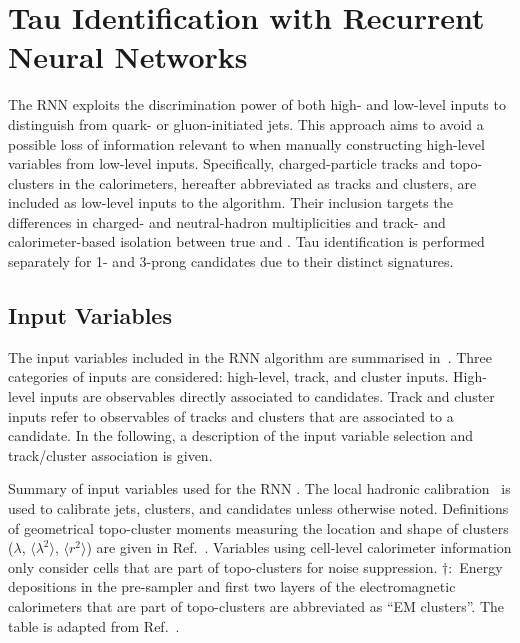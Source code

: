 \section{Tau Identification with Recurrent Neural Networks}%
\label{sec:tauid_rnn}

The RNN \tauid exploits the discrimination power of both high- and low-level
inputs to distinguish \tauhad from quark- or gluon-initiated jets. This approach
aims to avoid a possible loss of information relevant to \tauid when manually
constructing high-level variables from low-level inputs. Specifically,
charged-particle tracks and topo-clusters in the calorimeters, hereafter
abbreviated as tracks and clusters, are included as low-level inputs to the
algorithm. Their inclusion targets the differences in charged- and
neutral-hadron multiplicities and track- and calorimeter-based isolation between
true and \faketauhadvis. Tau identification is performed separately for 1- and
3-prong \tauhadvis candidates due to their distinct signatures.


\subsection{Input Variables}

The input variables included in the RNN \tauid algorithm are summarised
in~. Three categories of inputs are considered:
high-level, track, and cluster inputs. High-level inputs are observables
directly associated to \tauhadvis candidates. Track and cluster inputs refer to
observables of tracks and clusters that are associated to a \tauhadvis
candidate. In the following, a description of the input variable selection and
track/cluster association is given.

\begin{table}[htbp]
  \centering

  \caption[Input variables used for the RNN \tauid.]{Summary of input variables
    used for the RNN \tauid. The local hadronic calibration~\cite{PERF-2014-07}
    is used to calibrate jets, clusters, and \tauhadvis candidates unless
    otherwise noted. Definitions of geometrical topo-cluster moments measuring
    the location and shape of clusters ($\lambda$, $\langle \lambda^2 \rangle$,
    $\langle r^2 \rangle$) are given in Ref.~\cite{PERF-2014-07}. Variables
    using cell-level calorimeter information only consider cells that are part
    of topo-clusters for noise suppression. $\dagger$:~Energy depositions in the
    pre-sampler and first two layers of the electromagnetic calorimeters that
    are part of topo-clusters are abbreviated as ``EM clusters''. The table is
    adapted from Ref.~\cite{ATL-PHYS-PUB-2019-033}.}%
  \label{tab:tauid_input_variables}

  \resizebox{0.99\textwidth}{!}{
    
  }
\end{table}

